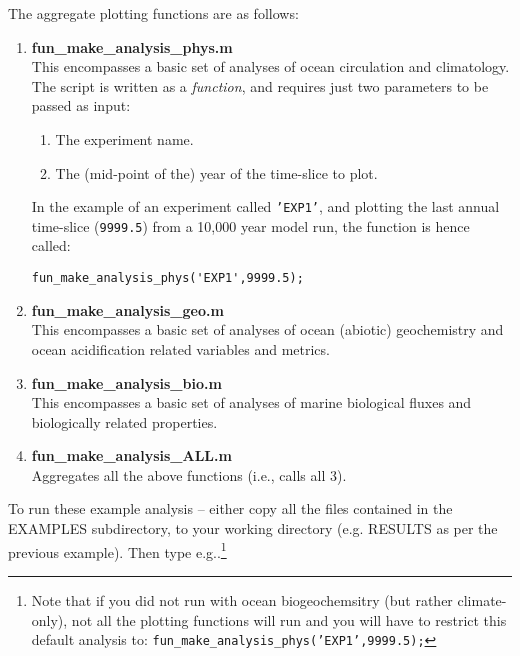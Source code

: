 \documentclass[11pt,fleqn]{book} %
\begin{document}
The aggregate plotting functions are as follows:

\begin{enumerate}[noitemsep]

\vspace{1pt}
\item \footnotesize\textbf{\textsf{fun\_make\_analysis\_phys.m}}\normalsize \\This encompasses a basic set of analyses of ocean circulation and climatology.
\\The script is written as a \textit{function}, and requires just two parameters to be passed as input:
\begin{enumerate}[noitemsep]
\setlength{\itemindent}{.2in}
\item The experiment name.
\item The (mid-point of the) year of the time-slice to plot.
\end{enumerate}
In the example of an experiment called \texttt{'EXP1'}, and plotting the last annual time-slice (\texttt{9999.5}) from a 10,000 year model run, the function is hence called:
\vspace{-2pt}\begin{verbatim}
fun_make_analysis_phys('EXP1',9999.5);
\end{verbatim}\vspace{-2pt}

\vspace{1pt}
\item \footnotesize\textbf{\textsf{fun\_make\_analysis\_geo.m}}\normalsize \\This encompasses a basic set of analyses of ocean (abiotic) geochemistry and ocean acidification related variables and metrics.

\vspace{1pt}
\item \footnotesize\textbf{\textsf{fun\_make\_analysis\_bio.m}}\normalsize \\This encompasses a basic set of analyses of marine biological fluxes and biologically related properties.
 
\vspace{1pt}
\item \footnotesize\textbf{\textsf{fun\_make\_analysis\_ALL.m}}\normalsize
\\Aggregates all the above functions (i.e., calls all 3).
\end{enumerate}

\vspace{2pt}
To run these example analysis -- either copy all the files contained in the \footnotesize\textsf{EXAMPLES }\normalsize subdirectory, to your working directory (e.g. \footnotesize\textsf{RESULTS }\normalsize as per the previous example). Then type e.g..\footnote{Note that if you did not run with ocean biogeochemsitry (but rather climate-only), not all the plotting functions will run and you will have to restrict this default analysis to: \texttt{fun\_make\_analysis\_phys('EXP1',9999.5);}}
\end{document}
